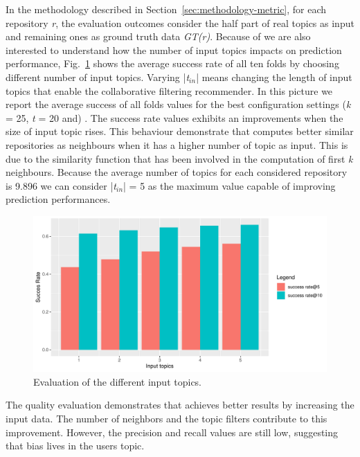 In the methodology described in Section~\ref{sec:methodology-metric}, for each repository \emph{r}, the evaluation outcomes consider the half part of real topics as input and remaining ones as ground truth data \emph{GT(r)}. Because of we are also interested to understand how the number of input topics impacts on prediction performance, Fig.~\ref{fig:pr-input-topics} shows the average success rate of all ten folds by choosing different number of input topics. Varying |\emph{t$_{in}$}| means changing the length of input topics that enable the \CT collaborative filtering recommender. In this picture we report the average success of all folds values for the best configuration settings (\ie \emph{k} = 25, \emph{t} = 20 and) . The success rate values exhibits an improvements when the size of input topic rises. This  behaviour demonstrate that \CT computes better similar repositories as neighbours when it has a higher number of topic as input. This is due to the similarity function that has been involved in the computation of first  \emph{k} neighbours. Because the average number of topics for each considered repository is 9.896 we can consider |\emph{t$_{in}$}| = 5 as the maximum value capable of improving prediction performances.
\begin{figure}[t!]
	\centering
	\includegraphics[width=\linewidth]{figs/sr_change_input_topics.pdf}
	\caption{Evaluation of the different input topics.}
	\label{fig:pr-input-topics}
\end{figure} 

\begin{tcolorbox}[boxrule=0.86pt,left=0.3em, right=0.3em,top=0.1em, bottom=0.05em]
The quality evaluation demonstrates that \CT achieves better results by increasing the input data. The number of neighbors and the topic filters contribute to this improvement. However, the precision and recall values are still low, suggesting that bias lives in the users topic.
\end{tcolorbox}


